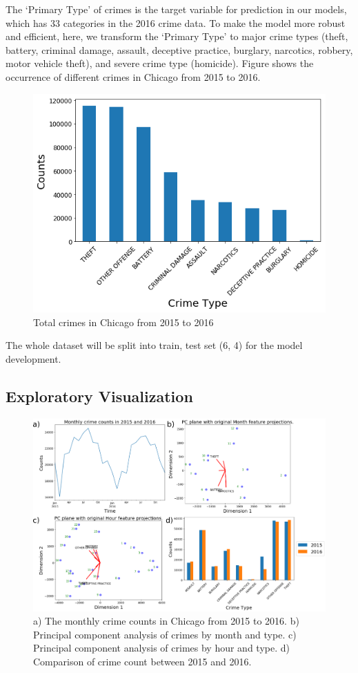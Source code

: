 \documentclass[12pt]{article}
\begin{document}
    The ‘Primary Type’ of crimes is the target variable for prediction in our models, which has 33 categories in the 2016 crime data. To make the model more robust and efficient, here, we transform the ‘Primary Type’ to major crime types (theft, battery, criminal damage, assault, deceptive practice, burglary, narcotics, robbery, motor vehicle theft), and severe crime type (homicide). Figure shows the occurrence of different crimes in Chicago from 2015 to 2016.
\begin{figure}[h]
\includegraphics[scale=0.5]{figure/total_crime.png}
\centering
\caption{Total crimes in Chicago from 2015 to 2016}
\end{figure}
  
The whole dataset will be split into train, test set (6, 4) for the model development.
\subsection{Exploratory Visualization}


\begin{figure}[h]
\includegraphics[scale=0.3]{figure/time.eps}
\centering
\caption{a) The monthly crime counts in Chicago from 2015 to 2016. b) Principal component analysis of crimes by month and type. c) Principal component analysis of crimes by hour and type. d) Comparison of crime count between 2015 and 2016.}
\end{figure}
\end{document}
